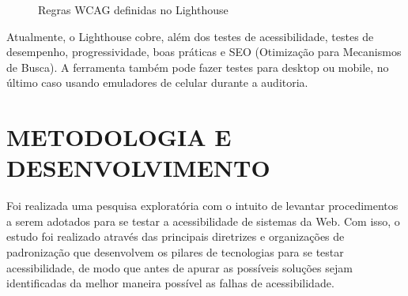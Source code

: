 \documentclass[
	12pt,				%
	openright,			%
	oneside,			%
	a4paper,			%
	chapter=TITLE,		%
	section=TITLE,		%
	subsection=TITLE,	%
	subsubsection=TITLE,%
	english,			%
	brazil				%
	]{abntex2}
\theoremstyle{definition}
\begin{document}
\begin{itemize}
\begin{figure}[!h]
\centering
\caption{Regras WCAG definidas no Lighthouse}
\label{Regras WCAG definidas no Lighthouse}
\end{figure}

\pagebreak

Atualmente, o Lighthouse cobre, além dos testes de acessibilidade, testes de desempenho, progressividade, boas práticas e SEO (Otimização para Mecanismos de Busca). A ferramenta também pode fazer testes para desktop ou mobile, no último caso usando emuladores de celular durante a auditoria.
    
\end{itemize}

\chapter{METODOLOGIA E DESENVOLVIMENTO}

Foi realizada uma pesquisa exploratória com o intuito de levantar procedimentos a serem adotados para se testar a acessibilidade de sistemas da Web. Com isso, o estudo foi realizado através das principais diretrizes e organizações de padronização que desenvolvem os pilares de tecnologias para se testar acessibilidade, de modo que antes de apurar as possíveis soluções sejam identificadas da melhor maneira possível as falhas de acessibilidade.
\end{document}
